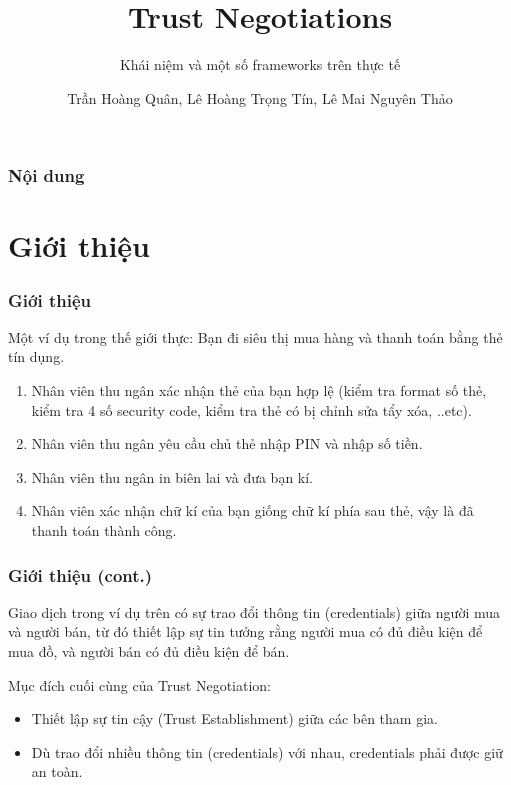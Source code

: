 \documentclass[11pt]{beamer}
\newcommand{\eg}{\text{e.g.\ }}
\begin{document}
\author{Trần Hoàng Quân, Lê Hoàng Trọng Tín, Lê Mai Nguyên Thảo}
\title{Trust Negotiations}
\subtitle{Khái niệm và một số frameworks trên thực tế}
\begin{frame}[plain]
\maketitle
\end{frame}

\begin{frame}
\frametitle{Nội dung}
\tableofcontents
\end{frame}

\section{Giới thiệu}
\begin{frame}
\frametitle{Giới thiệu}
Một ví dụ trong thế giới thực: Bạn đi siêu thị mua hàng và thanh toán bằng thẻ tín dụng.
\begin{enumerate}
\item Nhân viên thu ngân xác nhận thẻ của bạn hợp lệ (\eg kiểm tra format số thẻ, kiểm tra 4 số security code, kiểm tra thẻ có bị chỉnh sửa tẩy xóa, ..etc).
\item Nhân viên thu ngân yêu cầu chủ thẻ nhập PIN và nhập số tiền.
\item Nhân viên thu ngân in biên lai và đưa bạn kí.
\item Nhân viên xác nhận chữ kí của bạn giống chữ kí phía sau thẻ, vậy là đã thanh toán thành công.
\end{enumerate}
\end{frame}

\begin{frame}
\frametitle{Giới thiệu (cont.)}
Giao dịch trong ví dụ trên có sự trao đổi thông tin (credentials) giữa người mua và người bán, từ đó thiết lập sự tin tưởng rằng người mua có đủ điều kiện để mua đồ, và người bán có đủ điều kiện để bán.

Mục đích cuối cùng của Trust Negotiation:
\begin{itemize}
\item Thiết lập sự tin cậy (Trust Establishment) giữa các bên tham gia.
\item Dù trao đổi nhiều thông tin (credentials) với nhau, credentials phải được giữ an toàn.
\end{itemize}
\end{frame}
\end{document}
